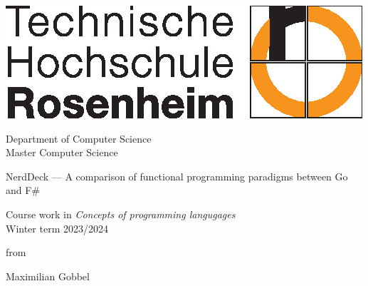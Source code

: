 \begin{titlepage}


\raggedleft

\vspace*{-2cm}

\includegraphics{logo-th-rosenheim-2019_master_quer_2c.eps}

\vfill

\centering
\LARGE
Department of Computer Science  \vspace{0.5cm}\\
\Large
Master Computer Science

\vspace{2cm}

\LARGE

NerdDeck --- A comparison of functional programming paradigms between Go and F\#

\vspace{2cm}

\Large
Course work in \textit{Concepts of programming langugages}\vspace{0.5cm}\\
Winter term 2023/2024

\vspace{1.5cm}


\Large
from

\vspace{0.5cm}


\LARGE
Maximilian Gobbel \vspace{0cm}


\vspace{1cm}

\flushleft
 \Large
\vspace*{\fill}


\end{titlepage}

\cleardoubleemptypage

